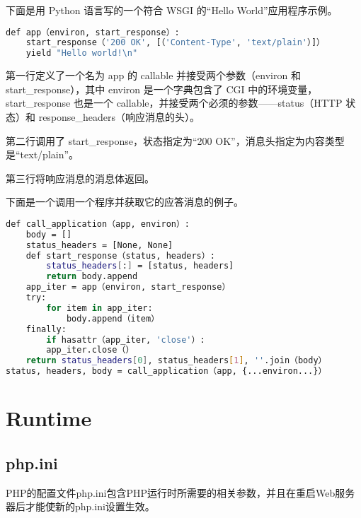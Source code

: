 下面是用 Python 语言写的一个符合 WSGI 的“Hello World”应用程序示例。



\begin{lstlisting}[language=bash]
def app（environ, start_response）:
	start_response（'200 OK', [（'Content-Type', 'text/plain'）]）
	yield "Hello world!\n"
\end{lstlisting}


\begin{compactitem}
\item 第一行定义了一个名为 app 的 callable 并接受两个参数（environ 和 start_response），其中 environ 是一个字典包含了 CGI 中的环境变量，start_response 也是一个 callable，并接受两个必须的参数——status（HTTP 状态）和 response_headers（响应消息的头）。
\item 第二行调用了 start_response，状态指定为“200 OK”，消息头指定为内容类型是“text/plain”。
\item 第三行将响应消息的消息体返回。

\end{compactitem}

下面是一个调用一个程序并获取它的应答消息的例子。

\begin{lstlisting}[language=bash]
def call_application（app, environ）:
	body = []
	status_headers = [None, None]
	def start_response（status, headers）:
		status_headers[:] = [status, headers]
		return body.append
	app_iter = app（environ, start_response）
	try:
		for item in app_iter:
			body.append（item）
	finally:
		if hasattr（app_iter, 'close'）:
		app_iter.close（）
	return status_headers[0], status_headers[1], ''.join（body）
status, headers, body = call_application（app, {...environ...}）
\end{lstlisting}










\chapter{Runtime}




\section{php.ini}



PHP的配置文件php.ini包含PHP运行时所需要的相关参数，并且在重启Web服务器后才能使新的php.ini设置生效。

